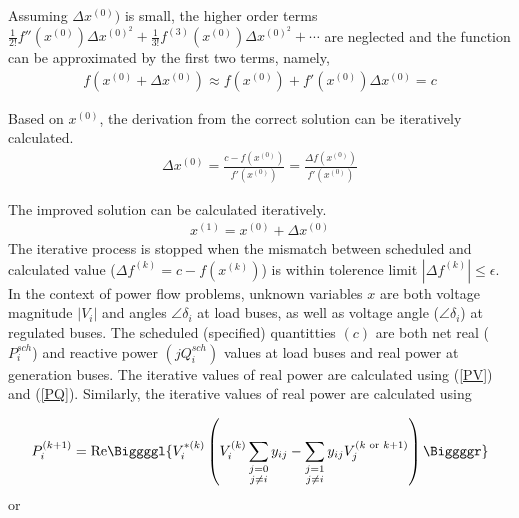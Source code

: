 \documentclass[11pt, oneside, reqno]{amsart}
\numberwithin{equation}{section}
\theoremstyle{plain}%
\theoremstyle{definition}
\theoremstyle{remark}
\begin{document}
Assuming $\Delta x^{(0)})$ is small, the higher order terms $\frac{1}{2!}f''(x^{(0)})\Delta x^{(0)^2} +\frac{1}{3!}f^{(3)}(x^{(0)})\Delta x^{(0)^2}+\cdots$ are neglected and the function can be approximated by the first two terms, namely,
\begin{align}
	f(x^{(0)}+\Delta x^{(0)})\approx f(x^{(0)})+f'(x^{(0)})\Delta x^{(0)}=c
\end{align}

Based on $x^{(0)}$, the derivation from the correct solution can be iteratively calculated.
\begin{align}
	\Delta x^{(0)}=\frac{c-f(x^{(0)})}{f'(x^{(0)})}=\frac{\Delta f(x^{(0)})}{f'(x^{(0)})}
\end{align}

The improved solution can be calculated iteratively.
\begin{align}
	x^{(1)}=x^{(0)}+\Delta x^{(0)}
\end{align}
The iterative process is stopped when the mismatch between scheduled and calculated value ($\Delta f^{(k)}=c-f(x^{(k)})$) is within tolerence limit $|\Delta f^{(k)}|\le \epsilon$.
In the context of power flow problems, unknown variables $x$ are both voltage magnitude $|V_i|$ and angles $\angle \delta_i$ at load buses, as well as voltage angle ($\angle \delta_i$) at regulated buses. The scheduled (specified) quantitties $(c)$ are both net real ($P^{sch}_i$) and reactive power $(jQ^{sch}_i)$ values at load buses and real power at generation buses. The iterative values of real power are calculated using (\ref{PV}) and (\ref{PQ}). Similarly, the iterative values of real power are calculated using 

\[
	P^{(k+1)}_i=\text{Re}\Biggggl\{V^{*(k)}_i\left(V^{(k)}_i\sum_{\substack{j=0 \\ j\neq i}}y_{ij}-\sum_{\substack{j=1 \\ j\neq i}}y_{ij}V^{(k\,\,\text{or}\,\,k+1)}_j\right)\Biggggr\}
\]
or
	      
\end{document}
